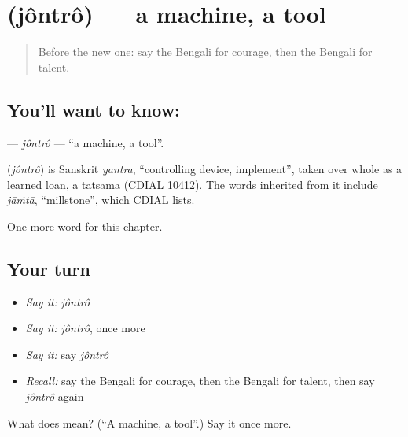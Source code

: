\section[\texorpdfstring{\bn{যন্ত্র} (jôntrô)}{যন্ত্র (jôntrô)}]{ (jôntrô) — a machine, a tool}

\label{lesson:BN-C100-jontro}



\begin{quote}
Before the new one: say the Bengali for courage, then the Bengali for talent.
\end{quote}

\subsection*{You'll want to know: }
\textbf{} — \emph{jôntrô} — \textquotedblleft{}a machine, a tool\textquotedblright{}.

\begin{cousinweb}
\textbf{} (\emph{jôntrô}) is Sanskrit \emph{yantra}, \textquotedblleft{}controlling device, implement\textquotedblright{}, taken over whole as a learned loan, a tatsama (CDIAL 10412). The words inherited from it include \emph{jāṁtā}, \textquotedblleft{}millstone\textquotedblright{}, which CDIAL lists.
\end{cousinweb}

\begin{grammarlens}[title={What you've built}]
One more word for this chapter.
\end{grammarlens}

\subsection*{Your turn}
\begin{itemize}
\raggedright
  \item \emph{Say it:} \emph{jôntrô}
  \item \emph{Say it:} \emph{jôntrô}, once more
  \item \emph{Say it:} say \emph{jôntrô}
  \item \emph{Recall:} say the Bengali for courage, then the Bengali for talent, then say \emph{jôntrô} again
\end{itemize}

\begin{tcolorbox}[breakable,colback=teal!4,colframe=teal!35!black,title={Before you move on}]
What does  mean? (\textquotedblleft{}A machine, a tool\textquotedblright{}.) Say it once more.
\end{tcolorbox}

